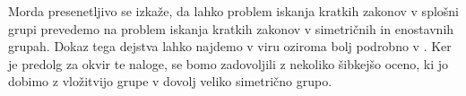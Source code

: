  Morda presenetljivo se izkaže, da lahko problem iskanja kratkih zakonov v splošni grupi prevedemo na problem iskanja kratkih zakonov v simetričnih in enostavnih grupah. 
 Dokaz tega dejstva lahko najdemo v viru \cite[str.~4--7]{Thom_2015} oziroma bolj podrobno v \cite[str.~27--42]{Schneider_2016}. Ker je predolg za okvir te naloge, se bomo zadovoljili z nekoliko šibkejšo oceno, ki jo dobimo z vložitvijo grupe v dovolj veliko simetrično grupo.



